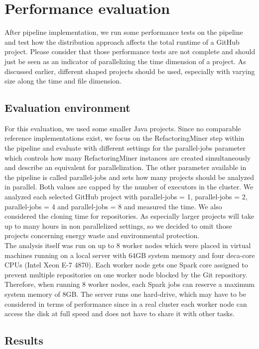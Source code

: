 \documentclass[conference]{IEEEtran}
\begin{document}
\section{Performance evaluation}
After pipeline implementation, we run some performance tests on the pipeline and test how the distribution approach affects the total runtime of a GitHub project. Please consider that those performance tests are not complete and should just be seen as an indicator of parallelizing the time dimension of a project. As discussed earlier, different shaped projects should be used, especially with varying size along the time and file dimension.
\subsection{Evaluation environment}
For this evaluation, we used some smaller Java projects. Since no comparable reference implementations exist, we focus on the RefactoringMiner step within the pipeline and evaluate with different settings for the parallel-jobs parameter which controls how many RefactoringMiner instances are created simultaneously and describe an equivalent for parallelization. The other parameter available in the pipeline is called parallel-jobs and sets how many projects should be analyzed in parallel. Both values are capped by the number of executors in the cluster. We analyzed each selected GitHub project with parallel-jobs = 1, parallel-jobs = 2, parallel-jobs = 4 and parallel-jobs = 8 and measured the time. We also considered the cloning time for repositories. As especially larger projects will take up to many hours in non parallelized settings, so we decided to omit those projects concerning energy waste and environmental protection.\\
The analysis itself was run on up to 8 worker nodes which were placed in virtual machines running on a local server with 64GB system memory and four deca-core CPUs (Intel Xeon E-7 4870). Each worker node gets one Spark core assigned to prevent multiple repositories on one worker node blocked by the Git repository. Therefore, when running 8 worker nodes, each Spark jobs can reserve a maximum system memory of 8GB. The server runs one hard-drive, which may have to be considered in terms of performance since in a real cluster each worker node can access the disk at full speed and does not have to share it with other tasks.
\subsection{Results}
\end{document}
